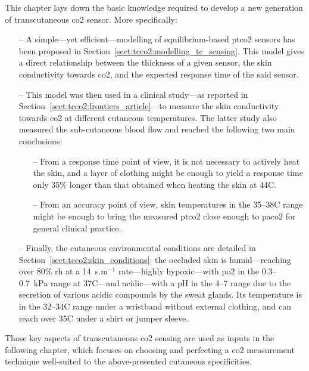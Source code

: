 This chapter lays down the basic knowledge required to develop a new generation of transcutaneous \gls{co2} sensor. More specifically:
\begin{itemize}
	\item[--] A simple---yet efficient---modelling of equilibrium-based \gls{ptco2} sensors has been proposed in Section~\ref{sect:tcco2:modelling_tc_sensing}. This model gives a direct relationship between the thickness of a given sensor, the skin conductivity towards \gls{co2}, and the expected response time of the said sensor.
	\item[--] This model was then used in a clinical study---as reported in Section~\ref{sect:tcco2:frontiers_article}---to measure the skin conductivity towards \gls{co2} at different cutaneous temperatures. The latter study also measured the sub-cutaneous blood flow and reached the following two main conclusions:
	\begin{itemize}
		\item[--] From a response time point of view, it is not necessary to actively heat the skin, and a layer of clothing might be enough to yield a response time only 35\% longer than that obtained when heating the skin at 44{\degree}C.
		\item[--] From an accuracy point of view, skin temperatures in the 35--38{\degree}C range might be enough to bring the measured \gls{ptco2} close enough to \gls{paco2} for general clinical practice.
	\end{itemize}
	\item[--] Finally, the cutaneous environmental conditions are detailed in Section~\ref{sect:tcco2:skin_conditions}: the occluded skin is humid---reaching over 80\% \gls{rh} at a 14~s.{\textmu}m$^{-1}$ rate---highly hypoxic---with \gls{po2} in the 0.3--0.7~kPa range at 37{\degree}C---and acidic---with a pH in the 4--7 range due to the secretion of various acidic compounds by the sweat glands. Its temperature is in the 32--34{\degree}C range under a wristband without external clothing, and can reach over 35{\degree}C under a shirt or jumper sleeve.
\end{itemize}

Those key aspects of transcutaneous \gls{co2} sensing are used as inputs in the following chapter, which focuses on choosing and perfecting a \gls{co2} measurement technique well-suited to the above-presented cutaneous specificities.
